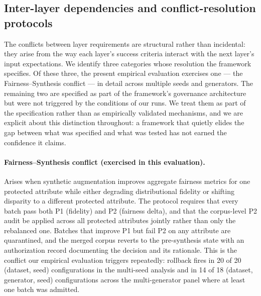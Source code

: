 \documentclass[11pt]{article}
\begin{document}
\subsection{Inter-layer dependencies and conflict-resolution protocols}
\label{sec:conflicts}

The conflicts between layer requirements are structural rather than incidental: they arise from the way each layer's success criteria interact with the next layer's input expectations. We identify three categories whose resolution the framework specifies. Of these three, the present empirical evaluation exercises one --- the Fairness--Synthesis conflict --- in detail across multiple seeds and generators. The remaining two are specified as part of the framework's governance architecture but were not triggered by the conditions of our runs. We treat them as part of the specification rather than as empirically validated mechanisms, and we are explicit about this distinction throughout: a framework that quietly elides the gap between what was specified and what was tested has not earned the confidence it claims.

\paragraph{Fairness--Synthesis conflict (exercised in this evaluation).} Arises when synthetic augmentation improves aggregate fairness metrics for one protected attribute while either degrading distributional fidelity or shifting disparity to a different protected attribute. The protocol requires that every batch pass both P1 (fidelity) and P2 (fairness delta), and that the corpus-level P2 audit be applied across all protected attributes jointly rather than only the rebalanced one. Batches that improve P1 but fail P2 on any attribute are quarantined, and the merged corpus reverts to the pre-synthesis state with an authorization record documenting the decision and its rationale. This is the conflict our empirical evaluation triggers repeatedly: rollback fires in 20 of 20 (dataset, seed) configurations in the multi-seed analysis and in 14 of 18 (dataset, generator, seed) configurations across the multi-generator panel where at least one batch was admitted.
\end{document}
